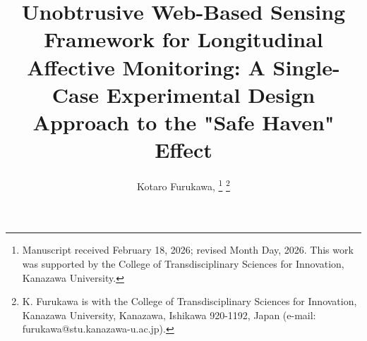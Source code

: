 \documentclass[journal]{IEEEtran}
\begin{document}
\title{Unobtrusive Web-Based Sensing Framework for Longitudinal Affective Monitoring: A Single-Case Experimental Design Approach to the "Safe Haven" Effect}

\author{Kotaro Furukawa, 
\thanks{Manuscript received February 18, 2026; revised Month Day, 2026. This work was supported by the College of Transdisciplinary Sciences for Innovation, Kanazawa University.}
\thanks{K. Furukawa is with the College of Transdisciplinary Sciences for Innovation, Kanazawa University, Kanazawa, Ishikawa 920-1192, Japan (e-mail: furukawa@stu.kanazawa-u.ac.jp).}}

\maketitle
\end{document}
